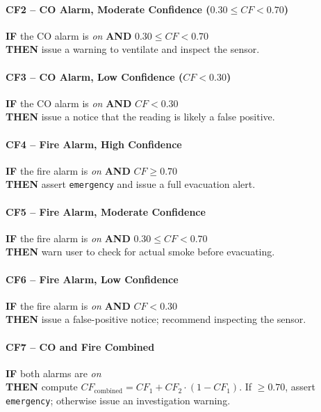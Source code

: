 \documentclass{article}
\begin{document}
\paragraph{CF2 -- CO Alarm, Moderate Confidence ($0.30 \leq CF < 0.70$)}
\textbf{IF} the CO alarm is \emph{on} \textbf{AND} $0.30 \leq CF < 0.70$ \\
\textbf{THEN} issue a warning to ventilate and inspect the sensor.

\paragraph{CF3 -- CO Alarm, Low Confidence ($CF < 0.30$)}
\textbf{IF} the CO alarm is \emph{on} \textbf{AND} $CF < 0.30$ \\
\textbf{THEN} issue a notice that the reading is likely a false positive.

\paragraph{CF4 -- Fire Alarm, High Confidence}
\textbf{IF} the fire alarm is \emph{on} \textbf{AND} $CF \geq 0.70$ \\
\textbf{THEN} assert \texttt{emergency} and issue a full evacuation alert.

\paragraph{CF5 -- Fire Alarm, Moderate Confidence}
\textbf{IF} the fire alarm is \emph{on} \textbf{AND} $0.30 \leq CF < 0.70$ \\
\textbf{THEN} warn user to check for actual smoke before evacuating.

\paragraph{CF6 -- Fire Alarm, Low Confidence}
\textbf{IF} the fire alarm is \emph{on} \textbf{AND} $CF < 0.30$ \\
\textbf{THEN} issue a false-positive notice; recommend inspecting the sensor.

\paragraph{CF7 -- CO and Fire Combined}
\textbf{IF} both alarms are \emph{on} \\
\textbf{THEN} compute $CF_{\text{combined}} = CF_1 + CF_2 \cdot (1 - CF_1)$. If $\geq 0.70$, assert \texttt{emergency}; otherwise issue an investigation warning.
\end{document}
